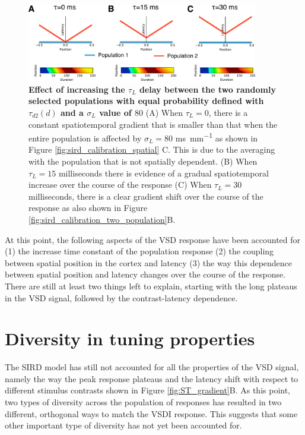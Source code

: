 \documentclass[phd,ianc,twoside]{infthesis}
\begin{document}
\begin{figure}
  \center
  \includegraphics[width=0.9\textwidth]{./figures/sird_calibration_population_delay.pdf}
\caption{{\bf Effect of increasing the $\tau_L$ delay between the two
    randomly selected populations with equal probability defined with
    $\tau_{d2}(d)$ and a $\sigma_L$ value of $80$ } (A) When $\tau_L=0$,
  there is a constant spatiotemporal gradient that is smaller than that
  when the entire population is affected by $\sigma_L=80$
  \si{ms.mm^{-1}} as shown in
  Figure \ref{fig:sird_calibration_spatial} C. This is due to the
  averaging with the population that is not spatially dependent. (B)
  When $\tau_L=15$ milliseconds there is evidence of a gradual
  spatiotemporal increase over the course of the response (C) When
  $\tau_L=30$ milliseconds, there is a clear gradient shift over the
  course of the response as also shown in Figure
  \ref{fig:sird_calibration_two_population}B.}
\label{fig:sird_calibration_population_delay}
\end{figure}


At this point, the following aspects of the VSD response have been
accounted for (1) the increase time constant of the population response
(2) the coupling between spatial position in the cortex and latency (3)
the way this dependence between spatial position and latency changes
over the course of the response. There are still at least two things
left to explain, starting with the long plateaus in the VSD signal,
followed by the contrast-latency dependence.

\section{Diversity in tuning properties}

The SIRD model has still not accounted for all the properties of the VSD
signal, namely the way the peak response plateaus and the latency shift
with respect to different stimulus contrasts shown in Figure
\ref{fig:ST_gradient}B. As this point, two types of diversity across the
population of responses has resulted in two different, orthogonal ways
to match the VSDI response. This suggests that some other important type
of diversity has not yet been accounted for.
\end{document}

